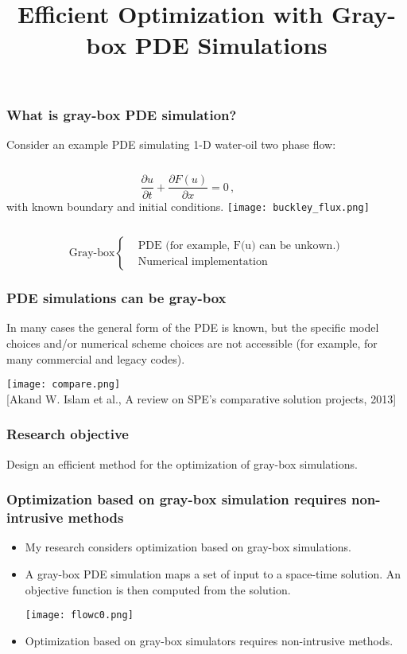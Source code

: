 \documentclass{beamer}
\title{Efficient Optimization with Gray-box PDE Simulations}
\begin{document}
\begin{frame}
    \titlepage
\end{frame}

\begin{frame}
    \frametitle{What is gray-box PDE simulation?}
    Consider an example PDE simulating 1-D water-oil two phase flow:
    \begin{columns}
        \begin{equation*}
            \frac{\partial u}{\partial t}+\frac{\partial F(u)}{\partial x}
            = 0\,,
        \end{equation*}
        with known boundary and initial conditions.
        \centering
        \texttt{[image: buckley\_flux.png]}
    \end{columns}
    \normalsize
    \begin{equation*}
        \textrm{Gray-box}\left\{
            \begin{split}
            &\textrm{PDE (for example, F(u) can be unkown.)}\\
            &\textrm{Numerical implementation}
            \end{split}
        \right.
    \end{equation*}
\end{frame}

\begin{frame}
    \frametitle{PDE simulations can be gray-box}
    In many cases the general form of the PDE is known, but the specific
    model choices and/or numerical scheme choices are not accessible (for example,
    for many commercial and legacy codes).
    \begin{center}
        \texttt{[image: compare.png]}\\
        \scriptsize{[Akand W. Islam et al., A review on SPE's comparative solution projects, 2013]}
    \end{center}
\end{frame}

\begin{frame}
    \frametitle{Research objective}
    Design an efficient method for the optimization of gray-box simulations.
\end{frame}

\begin{frame}
    \frametitle{Optimization based on gray-box simulation requires
        non-intrusive methods}
        \begin{itemize}
        \item My research considers optimization based on gray-box simulations.
        \item A gray-box PDE simulation maps a set of input to a space-time solution.
              An objective function is then computed from the solution.
        \begin{center}
        \texttt{[image: flowc0.png]}
        \end{center}
        \item Optimization based on gray-box simulators requires non-intrusive
        methods.
        \end{itemize}
\end{frame}
\end{document}
